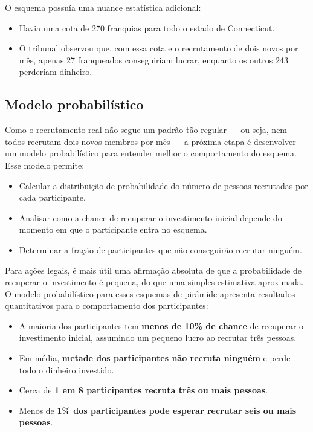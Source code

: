 \documentclass[a4paper,12pt]{article}
\begin{document}
O esquema possuía uma nuance estatística adicional:
\begin{itemize}[noitemsep]
\item Havia uma cota de 270 franquias para todo o estado de
  Connecticut.
\item O tribunal observou que, com essa cota e o recrutamento de dois
  novos por mês, apenas 27 franqueados conseguiriam lucrar, enquanto os
  outros 243 perderiam dinheiro.
\end{itemize}

\subsection*{Modelo probabilístico}

Como o recrutamento real não segue um padrão tão
regular — ou seja, nem todos recrutam dois novos membros por mês — a
próxima etapa é desenvolver um modelo probabilístico para entender
melhor o comportamento do esquema. Esse modelo permite:
\begin{itemize}[noitemsep]
\item Calcular a distribuição de probabilidade do número de pessoas
  recrutadas por cada participante.
\item Analisar como a chance de recuperar o investimento inicial
  depende do momento em que o participante entra no esquema.
\item Determinar a fração de participantes que não conseguirão recrutar
  ninguém.
\end{itemize}
Para ações legais, é mais útil uma {afirmação absoluta} de que a
probabilidade de recuperar o investimento é pequena, do que uma simples
estimativa aproximada. O modelo probabilístico para esses esquemas de
pirâmide apresenta resultados quantitativos para o comportamento dos
participantes:
\begin{itemize}[noitemsep]
\item A maioria dos participantes tem \textbf{menos de 10\% de chance}
  de recuperar o investimento inicial, assumindo um pequeno lucro ao
  recrutar três pessoas.
\item Em média, \textbf{metade dos participantes não recruta ninguém} e
  perde todo o dinheiro investido.
\item Cerca de \textbf{1 em 8 participantes recruta três ou mais
    pessoas}.
\item Menos de \textbf{1\% dos participantes pode esperar recrutar seis
    ou mais pessoas}.
\end{itemize}
\end{document}
